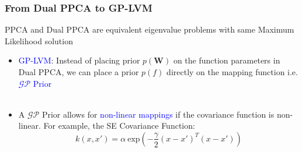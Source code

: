 \documentclass[10pt,handout]{beamer}
\begin{document}
\begin{frame}
\frametitle{From Dual PPCA to GP-LVM}

\begin{exampleblock}{}
  \centering
  PPCA and Dual PPCA are equivalent eigenvalue problems with same Maximum Likelihood solution
\end{exampleblock}

\begin{itemize}
  \item \textcolor{blue}{GP-LVM}: Instead of placing prior $p(\mathbf{W})$ on the function parameters in Dual PPCA, we can place a prior $p(f)$ directly on the mapping function i.e. \textcolor{blue}{$\mathcal{GP}$ Prior}\\~\\
  \item A $\mathcal{GP}$ Prior allows for \textcolor{blue}{non-linear mappings} if the covariance function is non-linear. For example, the SE Covariance Function:
    \begin{equation}
      k(x,x') = \alpha~\text{exp} \left( - \frac{\gamma}{2} (x - x')^T(x - x') \right)
    \end{equation}
\end{itemize}

\begin{figure}
  \centering
\end{figure}

\end{frame}
\end{document}
